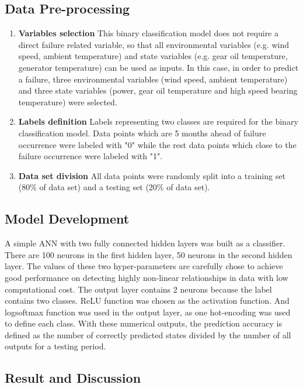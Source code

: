 \subsection{Data Pre-processing}

\begin{enumerate}
\item \textbf{Variables selection}
This binary classification model does not require a direct failure related variable, so that all environmental variables (e.g. wind speed, ambient temperature) and state variables (e.g. gear oil temperature, generator temperature) can be used as inputs. In this case, in order to predict a failure, three environmental variables (wind speed, ambient temperature) and three state variables (power, gear oil temperature and high speed bearing temperature) were selected.

\item \textbf{Labels definition}
Labels representing two classes are required for the binary classification model. Data points which are 5 months ahead of failure occurrence were labeled with "0" while the rest data points which close to the failure occurrence were labeled with "1". 

\item \textbf{Data set division}
All data points were randomly split into a training set (80\% of data set) and a testing set (20\% of data set).

\end{enumerate}

\subsection{Model Development}
A simple ANN with two fully connected hidden layers was built as a classifier. There are 100 neurons in the first hidden layer, 50 neurons in the second hidden layer. The values of these two hyper-parameters are carefully chose to achieve good performance on detecting highly non-linear relationships in data with low computational cost. The output layer contains 2 neurons because the label contains two classes. ReLU function was chosen as the activation function. And logsoftmax function was used in the output layer, as one hot-encoding was used to define each class. With these numerical outputs, the prediction accuracy is defined as the number of correctly predicted states divided by the number of all outputs for a testing period.

\subsection{Result and Discussion}

